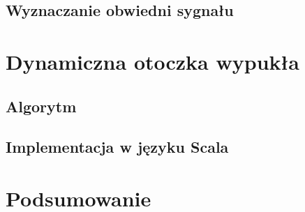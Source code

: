         \section{Wyznaczanie obwiedni sygnału}
    \chapter{Dynamiczna otoczka wypukła}
    	\section{Algorytm}
    	\section{Implementacja w języku Scala} 
	\chapter{Podsumowanie} 
      
    

